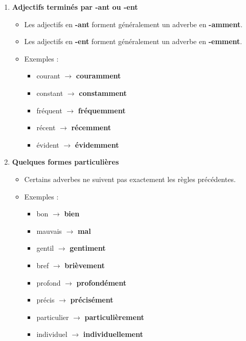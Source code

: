\documentclass[math,code]{amznotes}
\theoremstyle{remark}
\begin{document}
\begin{enumerate}
    \item \textbf{Adjectifs terminés par -ant ou -ent}
    \begin{itemize}
        \item Les adjectifs en \textbf{-ant} forment généralement un adverbe en \textbf{-amment}.
        \item Les adjectifs en \textbf{-ent} forment généralement un adverbe en \textbf{-emment}.
        \item Exemples :
        \begin{itemize}
            \item courant $\rightarrow$ \textbf{couramment}
            \item constant $\rightarrow$ \textbf{constamment}
            \item fréquent $\rightarrow$ \textbf{fréquemment}
            \item récent $\rightarrow$ \textbf{récemment}
            \item évident $\rightarrow$ \textbf{évidemment}
        \end{itemize}
    \end{itemize}

    \item \textbf{Quelques formes particulières}
    \begin{itemize}
        \item Certains adverbes ne suivent pas exactement les règles précédentes.
        \item Exemples :
        \begin{itemize}
            \item bon $\rightarrow$ \textbf{bien}
            \item mauvais $\rightarrow$ \textbf{mal}
            \item gentil $\rightarrow$ \textbf{gentiment}
            \item bref $\rightarrow$ \textbf{brièvement}
            \item profond $\rightarrow$ \textbf{profondément}
            \item précis $\rightarrow$ \textbf{précisément}
            \item particulier $\rightarrow$ \textbf{particulièrement}
            \item individuel $\rightarrow$ \textbf{individuellement}
        \end{itemize}
    \end{itemize}
\end{enumerate}
\end{document}
